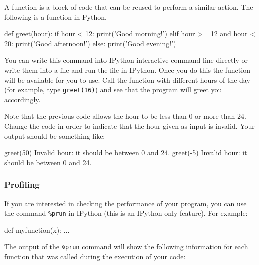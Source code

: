 A function is a block of code that can be reused to perform a similar action.
The following is a function in Python. 

\begin{python}
def greet(hour):
    if hour < 12:
        print('Good morning!')
    elif hour >= 12 and hour < 20:
        print('Good afternoon!')
    else:
        print('Good evening!')
\end{python}

You can write this command into IPython interactive command line directly or
write them into a file and run the file in IPython. Once you do this the
function will be available for you to use. Call the function  with
different hours of the day (for example, type \texttt{greet(16)}) and see that
the program will greet you accordingly.

\begin{exercise}
Note that the previous code allows the hour to be less than 0 or more than 24.
Change the code in order to indicate that the hour given as input is invalid.
Your output should be something like:

\begin{python}
greet(50)
Invalid hour: it should be between 0 and 24.
greet(-5)
Invalid hour: it should be between 0 and 24.
\end{python}

\end{exercise}

\subsubsection{Profiling}

If you are interested in checking the performance of your program, you can use
the command \texttt{\%prun} in IPython (this is an IPython-only feature). For
example:

\begin{python}
def myfunction(x):
    ...

\end{python}

The output of the \texttt{\%prun} command will show the following information
for each function that was called during the execution of your code:

